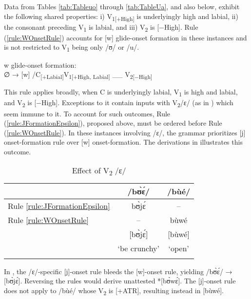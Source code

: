 \documentclass[output=paper,colorlinks,citecolor=brown]{langscibook}
\begin{document}
Data from Tables \ref{tab:Tableuo} through \ref{tab:TableUa}, and also  below, exhibit the following shared properties: i) V\textsubscript{1[+High]} is underlyingly high and labial, ii) the consonant preceding V\textsubscript{1} is labial, and iii) V\textsubscript{2} is [−High]. Rule (\ref{rule:WOnsetRule}) accounts for [w] glide-onset formation in these instances and is not restricted to V\textsubscript{1} being only /ʊ/ or /u/.

\ea \label{rule:WOnsetRule}
\begin{xlist}
w glide-onset formation:	\\
	∅ → [w] /C\textsubscript{[+Labial]}V\textsubscript{1[+High, Labial]} \_\_ V\textsubscript{2[−High]} \\
\end{xlist}
\z


This rule applies broadly, when C is underlyingly labial, V\textsubscript{1} is high and labial, and V\textsubscript{2} is [−High]. Exceptions to it contain inputs with V\textsubscript{2}/ɛ/ (as in ) which seem immune to it. To account for such outcomes, Rule (\ref{rule:JFormationEpsilon}),  proposed above, must be ordered before Rule (\ref{rule:WOnsetRule}). In these instances involving /ɛ/, the grammar prioritizes [j] onset-formation rule over [w] onset-formation. The derivations in  illustrates this outcome. 

 \begin{table}
\caption{Effect of V\textsubscript{2} /ɛ/}
\label{tab:Ordering1}
 \begin{tabular}{lcc}
  \lsptoprule
     & /bʊ̀ɛ́/ & /bùé/ \\
     \midrule
    Rule \ref{rule:JFormationEpsilon} & bʊ̀jɛ́ & -- \\
    Rule \ref{rule:WOnsetRule} & -- & bùwé \\
    \midrule
    & [bʊ̀jɛ́] & [bùwé] \\
    & `be crunchy' & `open' \\
  \lspbottomrule
 \end{tabular}
 \end{table}

In , the /ɛ/-specific [j]-onset rule bleeds the [w]-onset rule, yielding /bʊ̀ɛ́/ → [bʊ̀jɛ́]. Reversing the rules would derive unattested *[bʊ̀wɛ́]. The [j]-onset rule does not apply to /bùé/ whose V\textsubscript{2} is [+ATR],  resulting instead in [bùwé].
\end{document}
